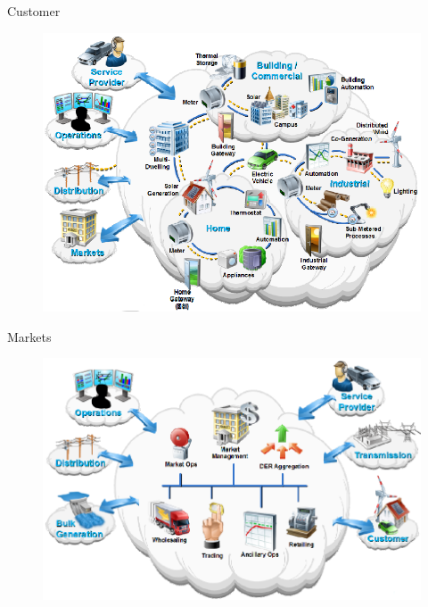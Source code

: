 
\begin{frame}[fragile]{Customer} 
	\begin{figure}[h] 
		\includegraphics[scale=0.45]{imgs/cust.png}
	\end{figure}
\end{frame}


\begin{frame}[fragile]{Markets}
	\begin{figure}[h] 
		\includegraphics[scale=0.45]{imgs/market.png}
	\end{figure}
\end{frame}


